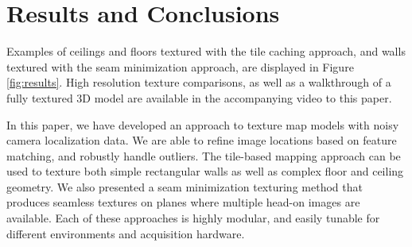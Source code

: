 \documentclass[10pt,twocolumn,letterpaper]{article}
\begin{document}
\section{Results and Conclusions}
\label{sec:resultsAndConclusions}
Examples of ceilings and floors textured with the tile caching
approach, and walls textured with the seam minimization approach, are
displayed in Figure \ref{fig:results}. High resolution texture
comparisons, as well as a walkthrough of a fully textured 3D model are
available in the accompanying video to this paper.

In this paper, we have developed an approach to texture map models
with noisy camera localization data. We are able to refine image
locations based on feature matching, and robustly handle outliers. The
tile-based mapping approach can be used to texture both simple
rectangular walls as well as complex floor and ceiling geometry. We
also presented a seam minimization texturing method that produces
seamless textures on planes where multiple head-on images are
available. Each of these approaches is highly modular, and easily
tunable for different environments and acquisition hardware.
\end{document}
